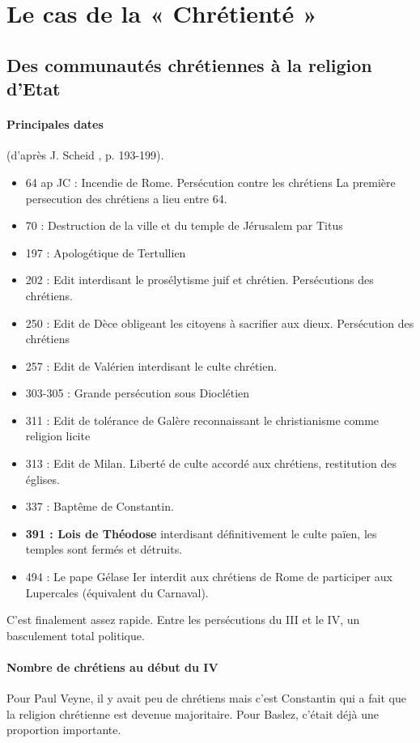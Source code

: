 \section{Le cas de la  « Chrétienté »}

\subsection{Des communautés chrétiennes à la religion d’Etat }
  
\paragraph{Principales dates} (d’après J. Scheid , p. 193-199).
\begin{itemize}
    \item  64 ap JC : Incendie de Rome. Persécution contre les chrétiens La première persecution des chrétiens a lieu entre 64.
    \item 70 : Destruction de la ville et du temple de Jérusalem par Titus 
    \item 197 : Apologétique de Tertullien 
    \item 202 : Edit interdisant le prosélytisme juif et chrétien. Persécutions des chrétiens. 
    \item 250 : Edit de Dèce obligeant les citoyens à sacrifier aux dieux. Persécution des chrétiens 
    \item 257 : Edit de Valérien interdisant le culte chrétien. 
    \item 303-305 : Grande persécution sous Dioclétien 
    \item 311 : Edit de tolérance de Galère reconnaissant le christianisme comme religion licite 
    \item 313 : Edit de Milan. Liberté de culte accordé aux chrétiens, restitution des églises. 
    \item 337 : Baptême de Constantin. 
    \item \textbf{391 : Lois de Théodose }interdisant définitivement le culte païen, les temples sont fermés et détruits. 
    \item 494 : Le pape Gélase Ier interdit aux chrétiens de Rome de participer aux Lupercales (équivalent du Carnaval). 
\end{itemize}
 C'est finalement assez rapide. Entre les persécutions du III et le IV, un basculement total politique.
 
 \paragraph{Nombre de chrétiens au début du IV} Pour Paul Veyne, il y avait peu de chrétiens mais c'est Constantin qui a fait que la religion chrétienne est devenue majoritaire. Pour Baslez, c'était déjà une proportion importante. 
 
